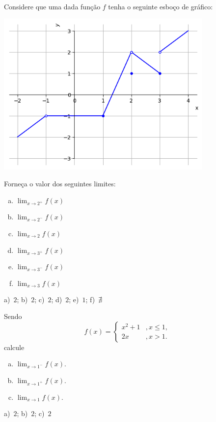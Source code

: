 \begin{exer}\label{exer:limgraf}
  Considere que uma dada função $f$ tenha o seguinte esboço de gráfico:

  \includegraphics[width=0.8\textwidth]{./cap_lim/dados/fig_exer_limgraf/fig_exer_limgraf}

  Forneça o valor dos seguintes limites:
  \begin{enumerate}[a)]
  \item $\displaystyle \lim_{x\to 2^+} f(x)$
  \item $\displaystyle \lim_{x\to 2^-} f(x)$
  \item $\displaystyle \lim_{x\to 2} f(x)$
  \item $\displaystyle \lim_{x\to 3^+} f(x)$
  \item $\displaystyle \lim_{x\to 3^-} f(x)$
  \item $\displaystyle \lim_{x\to 3} f(x)$
  \end{enumerate}
\end{exer}
\begin{resp}
  a)~$2$; b)~$2$; c)~$2$; d)~$2$; e)~$1$; f)~$\nexists$
\end{resp}

\begin{exer}
  Sendo
  \begin{equation}
    f(x) = \left\{
      \begin{array}{ll}
        x^2+1 &, x\leq 1,\\
        2x &, x>1.
      \end{array}
    \right.
  \end{equation}
  calcule
  \begin{enumerate}[a)]
  \item $\displaystyle \lim_{x\to 1^-} f(x)$.
  \item $\displaystyle \lim_{x\to 1^+} f(x)$.
  \item $\displaystyle \lim_{x\to 1} f(x)$.
  \end{enumerate}
\end{exer}
\begin{resp}
  a)~$2$; b)~$2$; c)~$2$
\end{resp}

